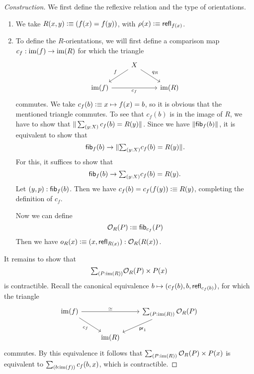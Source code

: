 \begin{proof}[Construction]
We first define the reflexive relation and the type of orientations.
\begin{enumerate}
\item We take $R(x,y)\vcentcolon\equiv (f(x)=f(y))$, with $\rho(x)\vcentcolon\equiv \mathsf{refl}_{f(x)}$. 
\item To define the $R$-orientations, we will first define a comparison map $c_f : \operatorname{im}(f)\to\operatorname{im}(R)$ for which the triangle
\begin{equation}\label{eq:intro_cf}
\begin{tikzcd}
& X \arrow[dl,swap,"f"] \arrow[dr,"q_R"] \\
\im(f) \arrow[rr,swap,"c_f"] & & \im(R)
\end{tikzcd}
\end{equation}
commutes. We take $c_f(b)\vcentcolon\equiv x\mapsto f(x)=b$, so it is obvious that the mentioned triangle commutes. To see that $c_f(b)$ is in the image of $R$, we have to show that $\brck{\sm{y:X} c_f(b)=R(y)}$. Since we have $\Vert \mathsf{fib}_{f}(b)\Vert_{}$, it is equivalent to show that
\begin{equation*}
\fib{f}{b}\to\brck{\sm{y:X}c_f(b)=R(y)}.
\end{equation*}
For this, it suffices to show that
\begin{equation*}
\fib{f}{b}\to\sm{y:X}c_f(b)=R(y).
\end{equation*}
Let ${\mathopen{}(y,p)\mathclose{}}:\mathsf{fib}_{f}(b)$. Then we have $c_f(b)=c_f(f(y))\vcentcolon\equiv R(y)$, completing the definition of $c_f$. 

Now we can define 
\begin{equation*}
\mathcal{O}_R(P)\vcentcolon\equiv \mathsf{fib}_{c_f}(P)
\end{equation*}
Then we have $o_R(x)\vcentcolon\equiv {\mathopen{}(x,\mathsf{refl}_{R(x)})\mathclose{}}:\mathcal{O}_R(R(x))$. 
\end{enumerate}
It remains to show that
\begin{equation*}
\sm{P:\im(R)}\mathcal{O}_R(P)\times P(x)
\end{equation*}
is contractible. Recall the canonical equivalence $b\mapsto{\mathopen{}(c_f(b),b,\mathsf{refl}_{c_f(b)})\mathclose{}}$, for which the triangle
\begin{equation*}
\begin{tikzcd}
\im(f) \arrow[dr,swap,"c_f"] \arrow[rr,"\eqvsym"] & & \sm{P:\im(R)}\mathcal{O}_R(P) \arrow[dl,"\proj1"] \\
& \im(R)
\end{tikzcd}
\end{equation*}
commutes. By this equivalence it follows that $\sm{P:\im(R)}\mathcal{O}_R(P)\times P(x)$ is equivalent to $\sm{b:\im(f)}c_f(b,x)$, which is contractible.
\end{proof}


